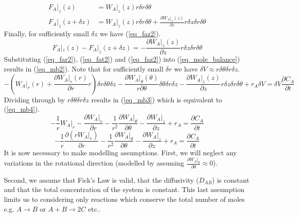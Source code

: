 \documentclass[11pt,fleqn]{article}
\theoremstyle{defstyle}
\begin{document}
\begin{equation}
\begin{aligned}
F_A|_z(z) &= W_A|_z(z) r \delta r \delta \theta \\
F_A|_z(z + \delta z) &= W_A|_z(z) r \delta r \delta \theta + \frac{\partial W_A|_z(z)}{\partial z}r \delta z \delta r \delta \theta 
\end{aligned}
\label{eq_faz}
\end{equation}
Finally, for sufficiently small $\delta z$ we have (\ref{eq_faz2}).
\begin{equation}
F_A|_z(z) - F_A|_z(z + \delta z) = - \frac{\partial W_A|_z(z)}{\partial z}r \delta z \delta r \delta \theta
\label{eq_faz2}
\end{equation}
Substituting (\ref{eq_far2}), (\ref{eq_fat2}) and (\ref{eq_faz2}) into (\ref{eq_mole_balance}) results in (\ref{eq_mb2}). Note that for sufficiently small $\delta r$ we have $\delta V \approx r \delta \theta \delta r \delta z$.
\begin{equation}
- \left(W_ A|_r(r)  + \frac{\partial W_A|_r(r)}{\partial r}r\right) \delta r \delta \theta \delta z - \frac{\partial W_A|_\theta(\theta)}{r \partial \theta}\delta \theta\delta r \delta z - \frac{\partial W_A|_z(z)}{\partial z}r \delta z \delta r \delta \theta + r_A \delta V = \delta V \frac{\partial C_A}{\partial t}
\label{eq_mb2}
\end{equation}
Dividing through by $r \delta \theta \delta r \delta z$ results in (\ref{eq_mb3}) which is equivalent to (\ref{eq_mb4}).
\begin{equation}
-\frac{1}{r} W_A|_r - \frac{\partial W_A|_r}{\partial r} - \frac{1}{r^2}\frac{\partial W_A|_\theta}{\partial \theta} - \frac{\partial W_A|_z}{\partial z}+ r_A  = \frac{\partial C_A}{\partial t}
\label{eq_mb3}
\end{equation}
\begin{equation}
-\frac{1}{r} \frac{\partial (rW_A|_r)}{\partial r} - \frac{1}{r^2}\frac{\partial W_A|_\theta}{\partial \theta} - \frac{\partial W_A|_z}{\partial z}+ r_A  = \frac{\partial C_A}{\partial t}
\label{eq_mb4}
\end{equation}
It is now necessary to make modelling assumptions. First, we will neglect any variations in the rotational direction (modelled by assuming $\frac{\partial W_A|_\theta}{\partial \theta} \approx 0$).

Second, we assume that Fick's Law is valid, that the diffusivity ($D_{AB}$) is constant and that the total concentration of the system is constant. This last assumption limits us to considering only reactions which conserve the total number of moles e.g. $A \rightarrow B$ or $A + B \rightarrow 2C$ etc..
\end{document}
